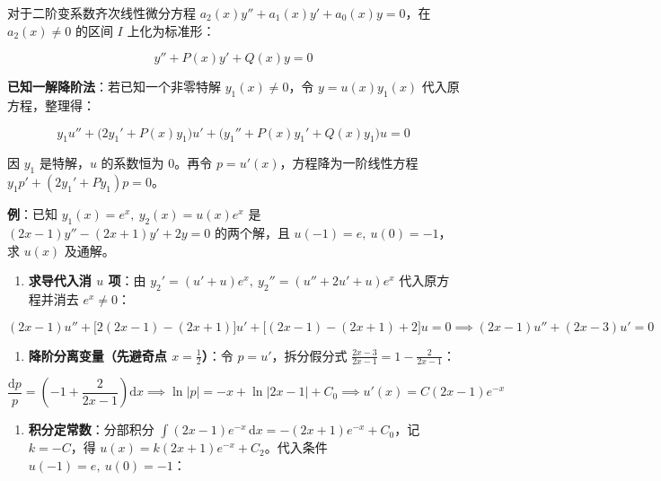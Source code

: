 \documentclass[12pt,a4paper]{ctexart}
\begin{document}

对于二阶变系数齐次线性微分方程 $a_2(x)y''+a_1(x)y'+a_0(x)y=0$，在 $a_2(x)\neq 0$ 的区间 $I$ 上化为标准形：

\[
y''+P(x)y'+Q(x)y=0
\]

\textbf{已知一解降阶法}：若已知一个非零特解 $y_1(x)\neq 0$，令 $y=u(x)y_1(x)$ 代入原方程，整理得：

\[
y_1 u'' + \big(2y_1' + P(x)y_1\big)u' + \big(y_1''+P(x)y_1'+Q(x)y_1\big)u = 0
\]

因 $y_1$ 是特解，$u$ 的系数恒为 $0$。再令 $p=u'(x)$，方程降为一阶线性方程 $y_1 p'+(2y_1'+Py_1)p=0$。




\textbf{例}：已知 $y_1(x)=e^x,\ y_2(x)=u(x)e^x$ 是 $(2x-1)y''-(2x+1)y'+2y=0$ 的两个解，且 $u(-1)=e,\ u(0)=-1$，求 $u(x)$ 及通解。

\begin{enumerate}

\item \textbf{求导代入消 $u$ 项}：由 $y_2'=(u'+u)e^x,\ y_2''=(u''+2u'+u)e^x$ 代入原方程并消去 $e^x\neq 0$：

\end{enumerate}

\[
(2x-1)u''+\big[2(2x-1)-(2x+1)\big]u'+\big[(2x-1)-(2x+1)+2\big]u=0 \implies (2x-1)u''+(2x-3)u'=0
\]

\begin{enumerate}

\item \textbf{降阶分离变量（先避奇点 $x=\frac{1}{2}$）}：令 $p=u'$，拆分假分式 $\frac{2x-3}{2x-1}=1-\frac{2}{2x-1}$：

\end{enumerate}

\[
\frac{\mathrm{d}p}{p}=\left(-1+\frac{2}{2x-1}\right)\mathrm{d}x \implies \ln|p|=-x+\ln|2x-1|+C_0 \implies u'(x)=C(2x-1)e^{-x}
\]

\begin{enumerate}

\item \textbf{积分定常数}：分部积分 $\int(2x-1)e^{-x}\,\mathrm{d}x=-(2x+1)e^{-x}+C_0$，记 $k=-C$，得 $u(x)=k(2x+1)e^{-x}+C_2$。代入条件 $u(-1)=e,\ u(0)=-1$：

\end{enumerate}
\end{document}
